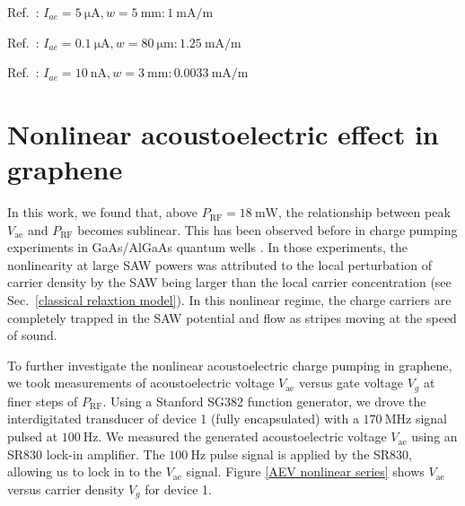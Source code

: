 \documentclass{beavtex_dub_edit}
\begin{document}
\noindent
Ref.\ \cite{okuda_acoustic_2016}: $I_{ae} = \SI{5}{\micro \ampere}, w = \SI{5}{\milli\meter}: \SI{1}{\milli \ampere/\meter}$

\noindent
Ref.\ \cite{tang_ultra-low_2017}: $I_{ae} = \SI{0.1}{\micro \ampere}, w = \SI{80}{\micro\meter}: \SI{1.25}{\milli \ampere/\meter}$

\noindent
Ref.\ \cite{bandhu_controlling_2016}: $I_{ae} = \SI{10}{\nano \ampere}, w = \SI{3}{\milli\meter}: \SI{0.0033}{\milli \ampere/\meter}$


\section{Nonlinear acoustoelectric effect in graphene} \label{nonlinear acoustoelectric effect}

In this work, we found that, above $P_{\mathrm{RF}} = \SI{18}{\milli\watt}$, the relationship between peak $V_{\mathrm{ae}}$ and $P_{\mathrm{RF}}$ becomes sublinear. This has been observed before in charge pumping experiments in GaAs/AlGaAs quantum wells \cite{rotter_charge_1999,rotter_nonlinear_1999}. In those experiments, the nonlinearity at large SAW powers was attributed to the local perturbation of carrier density by the SAW being larger than the local carrier concentration (see Sec.\ \ref{classical relaxtion model}). In this nonlinear regime, the charge carriers are completely trapped in the SAW potential and flow as stripes moving at the speed of sound.

To further investigate the nonlinear acoustoelectric charge pumping in graphene, we took measurements of acoustoelectric voltage $V_{\mathrm{ae}}$ versus gate voltage $V_g$ at finer steps of $P_{\mathrm{RF}}$. Using a Stanford SG382 function generator, we drove the interdigitated transducer of device 1 (fully encapsulated) with a $\SI{170}{\mega\hertz}$ signal pulsed at $\SI{100}{\hertz}$. We measured the generated acoustoelectric voltage $V_{\mathrm{ae}}$ using an SR830 lock-in amplifier. The $\SI{100}{\hertz}$ pulse signal is applied by the SR830, allowing us to lock in to the $V_{\mathrm{ae}}$ signal. Figure \ref{AEV nonlinear series} shows $V_{\mathrm{ae}}$ versus carrier density $V_g$ for device 1.
\end{document}
